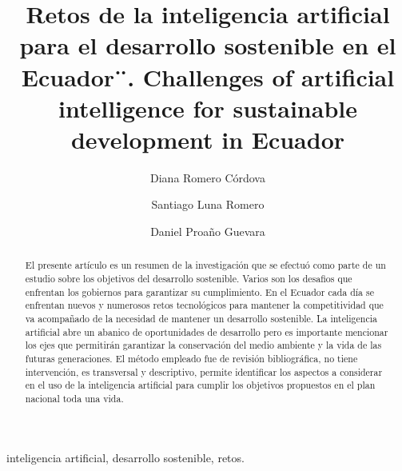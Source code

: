 \documentclass[preprint,12pt,3p]{elsarticle}
\begin{document}
\begin{frontmatter}

\title{Retos de la inteligencia artificial para el desarrollo sostenible en el Ecuador¨. {Challenges of artificial intelligence for sustainable development in Ecuador}}


\author[label1,label4]{Diana Romero Córdova}
\address[label1]{Universidad Internacional de la Rioja}
\address[label4]{Universidad Católica de Cuenca}



\author[label1,label5]{Santiago Luna Romero}
\address[label5]{Universidad Politécnica Salesiana}

\author[label1,label5]{Daniel Proaño Guevara}

\begin{abstract}
El presente artículo es un resumen de la investigación que se efectuó como parte de un estudio sobre los objetivos del desarrollo sostenible. Varios son los desafios que enfrentan los gobiernos para garantizar su cumplimiento. En el Ecuador cada día se enfrentan nuevos y numerosos retos tecnológicos para mantener la competitividad que va acompañado de la necesidad de mantener un desarrollo sostenible. La inteligencia artificial abre un abanico de oportunidades de desarrollo pero es importante mencionar los ejes que permitirán garantizar la conservación del medio ambiente y la vida de las futuras generaciones. El método empleado fue de revisión bibliográfica, no tiene intervención, es transversal y descriptivo, permite identificar los aspectos a considerar en el uso de la inteligencia artificial para cumplir los objetivos propuestos en el plan nacional toda una vida.
\end{abstract}

\begin{keyword}
inteligencia artificial, desarrollo sostenible, retos.
\end{keyword}

\end{frontmatter}
\end{document}
